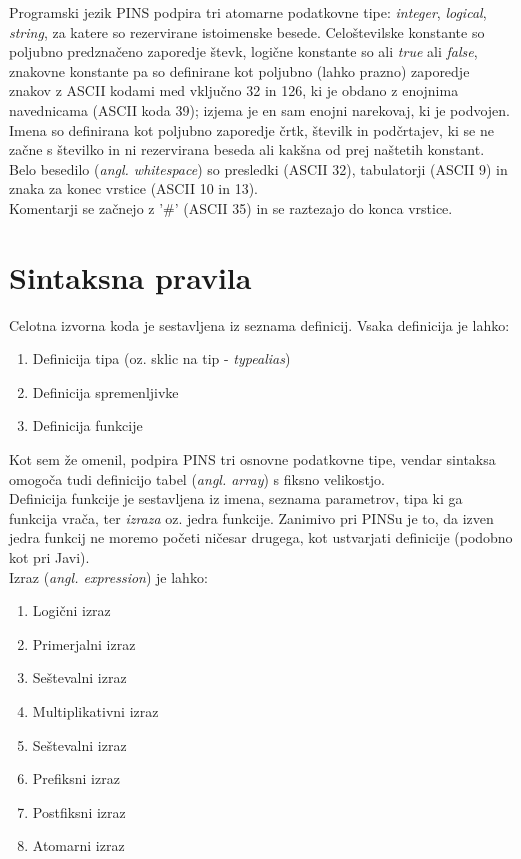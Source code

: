 \documentclass[a4paper, 12pt]{book}
\begin{document}
Programski jezik PINS podpira tri atomarne podatkovne tipe: \textit{integer}, \textit{logical}, \textit{string}, za katere so rezervirane istoimenske besede. Celoštevilske konstante so poljubno predznačeno zaporedje števk, logične konstante so ali \textit{true} ali \textit{false}, znakovne konstante pa so definirane kot poljubno (lahko prazno) zaporedje znakov z ASCII kodami med vključno 32 in 126, ki je obdano z enojnima navednicama (ASCII koda 39); izjema je en sam enojni narekovaj, ki je podvojen. \\
\indent Imena so definirana kot poljubno zaporedje črtk, številk in podčrtajev, ki se ne začne s številko in ni rezervirana beseda ali kakšna od prej naštetih konstant. \\
\indent Belo besedilo (\textit{angl. whitespace}) so presledki (ASCII 32), tabulatorji (ASCII 9) in znaka za konec vrstice (ASCII 10 in 13). \\
\indent Komentarji se začnejo z '\#' (ASCII 35) in se raztezajo do konca vrstice.

\section{Sintaksna pravila}

Celotna izvorna koda je sestavljena iz seznama definicij. Vsaka definicija je lahko:

\begin{enumerate}
	\item Definicija tipa (oz. sklic na tip - \textit{typealias})
	\item Definicija spremenljivke
	\item Definicija funkcije
\end{enumerate}

Kot sem že omenil, podpira PINS tri osnovne podatkovne tipe, vendar sintaksa omogoča tudi definicijo tabel (\textit{angl. array}) s fiksno velikostjo. \\
\indent Definicija funkcije je sestavljena iz imena, seznama parametrov, tipa ki ga funkcija vrača, ter \textit{izraza} oz. jedra funkcije. Zanimivo pri PINSu je to, da izven jedra funkcij ne moremo početi ničesar drugega, kot ustvarjati definicije (podobno kot pri Javi). \\
\indent Izraz (\textit{angl. expression}) je lahko:
\begin{enumerate}
	\item Logični izraz
	\item Primerjalni izraz
	\item Seštevalni izraz
	\item Multiplikativni izraz
	\item Seštevalni izraz
	\item Prefiksni izraz
	\item Postfiksni izraz
	\item Atomarni izraz
\end{enumerate}
\end{document}
